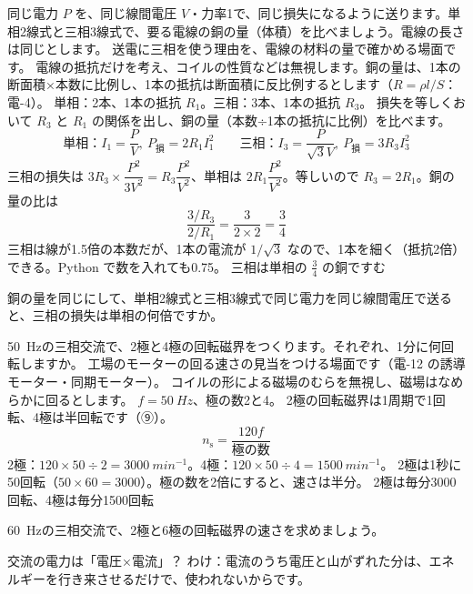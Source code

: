 \label{ph:電-11:ex12}
\begin{phreidai}
同じ電力 $P$ を、同じ線間電圧 $V$・力率1で、同じ損失になるように送ります。単相2線式と三相3線式で、要る電線の銅の量（体積）を比べましょう。電線の長さは同じとします。
\phbamen
送電に三相を使う理由を、電線の材料の量で確かめる場面です。
\phmushi
電線の抵抗だけを考え、コイルの性質などは無視します。銅の量は、1本の断面積×本数に比例し、1本の抵抗は断面積に反比例するとします（$R=\rho l/S$：電-4）。
\phzu
単相：2本、1本の抵抗 $R_1$。三相：3本、1本の抵抗 $R_3$。
\phriyu
損失を等しくおいて $R_3$ と $R_1$ の関係を出し、銅の量（本数÷1本の抵抗に比例）を比べます。
\phtateru
\[\text{単相：}I_1=\frac{P}{V},\ P_{\text{損}}=2R_1I_1^2\qquad\text{三相：}I_3=\frac{P}{\sqrt3V},\ P_{\text{損}}=3R_3I_3^2\]
\phtoku
三相の損失は $3R_3\times\dfrac{P^2}{3V^2}=R_3\dfrac{P^2}{V^2}$、単相は $2R_1\dfrac{P^2}{V^2}$。等しいので $R_3=2R_1$。銅の量の比は
\[\frac{3/R_3}{2/R_1}=\frac{3}{2\times2}=\frac34\]
\phtashikame
三相は線が1.5倍の本数だが、1本の電流が $1/\sqrt3$ なので、1本を細く（抵抗2倍）できる。Python で数を入れても0.75。
\kotae 三相は単相の $\tfrac34$ の銅ですむ
\end{phreidai}
\begin{jibun}
銅の量を同じにして、単相2線式と三相3線式で同じ電力を同じ線間電圧で送ると、三相の損失は単相の何倍ですか。
\end{jibun}

\label{ph:電-11:ex13}
\begin{phreidai}[回転磁界の速さ]
\qty{50}{Hz}の三相交流で、2極と4極の回転磁界をつくります。それぞれ、1分に何回転しますか。
\phbamen
工場のモーターの回る速さの見当をつける場面です（電-12 の誘導モーター・同期モーター）。
\phmushi
コイルの形による磁場のむらを無視し、磁場はなめらかに回るとします。
\phzu
$f=\qty{50}{Hz}$、極の数2と4。
\phriyu
2極の回転磁界は1周期で1回転、4極は半回転です（⑨）。
\phtateru
\[n_{\mathrm s}=\frac{120f}{\text{極の数}}\]
\phtoku
2極：$120\times50\div2=\qty{3000}{min^{-1}}$。4極：$120\times50\div4=\qty{1500}{min^{-1}}$。
\phtashikame
2極は1秒に50回転（$50\times60=3000$）。極の数を2倍にすると、速さは半分。
\kotae 2極は毎分3000回転、4極は毎分1500回転
\end{phreidai}
\begin{jibun}
\qty{60}{Hz}の三相交流で、2極と6極の回転磁界の速さを求めましょう。
\end{jibun}

\begin{tsumazuki}{交流の電力は「電圧×電流」？}
わけ：電流のうち電圧と山がずれた分は、エネルギーを行き来させるだけで、使われないからです。
\end{tsumazuki}

